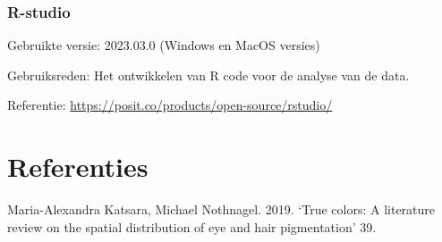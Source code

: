 \documentclass[
]{article}
\newlength{\cslhangindent}
\newlength{\cslentryspacingunit} %
\newenvironment{CSLReferences}[2] %
 {%
  \setlength{\parindent}{0pt}
  \ifodd #1
  \let\oldpar\par
  \def\par{\hangindent=\cslhangindent\oldpar}
  \fi
  \setlength{\parskip}{#2\cslentryspacingunit}
 }%
 {}
\begin{document}
\hypertarget{r-studio}{%
\subsubsection{R-studio}\label{r-studio}}

Gebruikte versie: 2023.03.0 (Windows en MacOS versies)

Gebruiksreden: Het ontwikkelen van R code voor de analyse van de data.

Referentie: \url{https://posit.co/products/open-source/rstudio/}

\hypertarget{referenties}{%
\section*{Referenties}\label{referenties}}

\hypertarget{refs}{}
\begin{CSLReferences}{1}{0}
\leavevmode{}%
Maria-Alexandra Katsara, Michael Nothnagel. 2019. {`True colors: A literature review on the spatial distribution of eye and hair pigmentation'} 39.

\end{CSLReferences}
\end{document}
